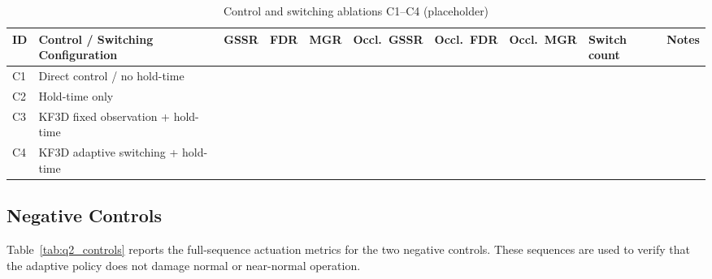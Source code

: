 \documentclass[pdflatex,sn-mathphys-num]{sn-jnl}%
\theoremstyle{thmstyleone}%
\theoremstyle{thmstyletwo}%
\theoremstyle{thmstylethree}%
\begin{document}
\begin{table}[t]
\centering
\caption{Control and switching ablations C1--C4 (placeholder)}
\label{tab:res_c_ablation}
{\small
\setlength{\tabcolsep}{3pt}
\renewcommand{\arraystretch}{1.12}
\begin{tabularx}{\textwidth}{@{}
>{\centering\arraybackslash}p{}
>{\raggedright\arraybackslash}p{}
>{\centering\arraybackslash}p{}
>{\centering\arraybackslash}p{}
>{\centering\arraybackslash}p{}
>{\centering\arraybackslash}p{}
>{\centering\arraybackslash}p{}
>{\centering\arraybackslash}p{}
>{\centering\arraybackslash}p{}
>{\raggedright\arraybackslash}p{}
@{}}
\toprule
\textbf{ID} & \textbf{Control / Switching Configuration} & \textbf{GSSR} & \textbf{FDR} & \textbf{MGR} & \textbf{Occl.\ GSSR} & \textbf{Occl.\ FDR} & \textbf{Occl.\ MGR} & \textbf{Switch count} & \textbf{Notes} \\
\midrule
C1 & Direct control / no hold-time        &  &  &  &  &  &  &  &  \\
C2 & Hold-time only                       &  &  &  &  &  &  &  &  \\
C3 & KF3D fixed observation + hold-time   &  &  &  &  &  &  &  &  \\
C4 & KF3D adaptive switching + hold-time  &  &  &  &  &  &  &  &  \\
\bottomrule
\end{tabularx}
}
\end{table}

\FloatBarrier

\subsection{Negative Controls}
\label{subsec:res_controls}

Table~\ref{tab:q2_controls} reports the full-sequence actuation metrics
for the two negative controls. These sequences are used to verify that
the adaptive policy does not damage normal or near-normal operation.
\end{document}
